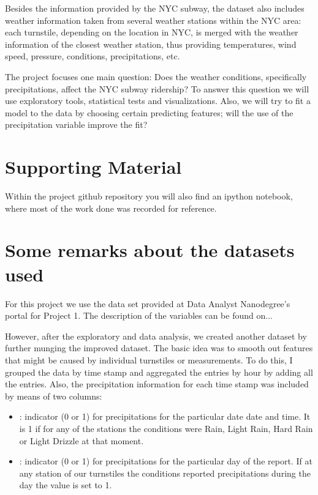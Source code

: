 \documentclass[a4paper,12pt,english]{sphinxmanual}
\begin{document}
Besides the information provided by the NYC subway, the dataset also includes
weather information taken from several weather stations within the NYC area:
each turnstile, depending on the location in NYC, is merged with the weather
information of the closest weather station, thus providing temperatures, wind
speed, pressure, conditions, precipitations, etc.

The project focuses one main question: Does the weather conditions, specifically
precipitations, affect the NYC subway ridership? To answer this question we
will use exploratory tools, statistical tests and visualizations. Also, we will
try to fit a model to the data by choosing certain predicting features; will
the use of the precipitation variable improve the fit?


\section{Supporting Material}
\label{overview:supporting-material}
Within the project github repository you will also find an ipython notebook,
where most of the work done was recorded for reference.


\section{Some remarks about the datasets used}
\label{overview:some-remarks-about-the-datasets-used}
For this project we use the data set provided at Data Analyst Nanodegree's
portal for Project 1. The description of the variables can be found on...

However, after the exploratory and data analysis, we created another dataset by
further munging the improved dataset. The basic idea was to smooth out features that
might be caused by individual turnstiles or measurements. To do this, I
grouped the data by time stamp and aggregated the entries by hour by adding all
the entries. Also, the precipitation information for each
time stamp was included by means of two columns:
\begin{itemize}
\item {} 
: indicator (0 or 1) for precipitations for the particular date
date and time. It is 1 if for any of the stations the conditions were Rain,
Light Rain, Hard Rain or Light Drizzle at that moment.

\item {} 
: indicator (0 or 1) for precipitations for the particular day
of the report. If at any station of our turnstiles the conditions reported
precipitations during the day the value is set to 1.

\end{itemize}
\end{document}

